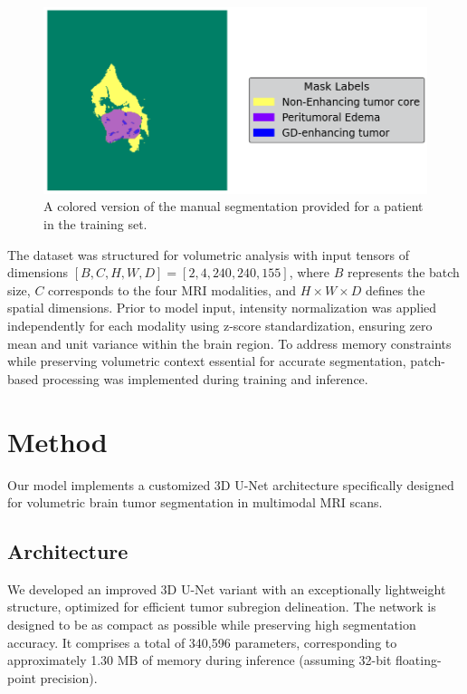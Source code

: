 \documentclass[10pt,twocolumn,letterpaper]{article}
\begin{document}
\begin{figure}[H]
\centering
\includegraphics[width=0.65\linewidth]{img/groundtruth_example.png}
\caption{A colored version of the manual segmentation provided for a patient in the training set.}
\end{figure}

The dataset was structured for volumetric analysis with input tensors of dimensions $[B, C, H, W, D] = [2, 4, 240, 240, 155]$, where $B$ represents the batch size, $C$ corresponds to the four MRI modalities, and $H \times W \times D$ defines the spatial dimensions. Prior to model input, intensity normalization was applied independently for each modality using z-score standardization, ensuring zero mean and unit variance within the brain region. To address memory constraints while preserving volumetric context essential for accurate segmentation, patch-based processing was implemented during training and inference.
\section{Method}
Our model implements a customized 3D U-Net architecture specifically designed for volumetric brain tumor segmentation in multimodal MRI scans.

\subsection{Architecture} \label{Architecture}
We developed an improved 3D U-Net variant with an exceptionally lightweight structure, optimized for efficient tumor subregion delineation. The network is designed to be as compact as possible while preserving high segmentation accuracy. It comprises a total of 340,596 parameters, corresponding to approximately 1.30 MB of memory during inference (assuming 32-bit floating-point precision).
\end{document}
